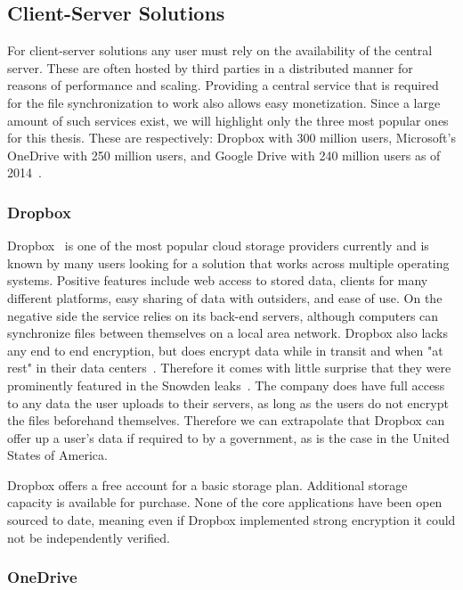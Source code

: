 \subsection{Client-Server Solutions}
\label{sub:Client-Server Solutions}

For client-server solutions any user must rely on the availability of the central server.
These are often hosted by third parties in a distributed manner for reasons of performance and scaling.
Providing a central service that is required for the file synchronization to work also allows easy monetization.
Since a large amount of such services exist, we will highlight only the three most popular ones for this thesis.
These are respectively: Dropbox with 300 million users, Microsoft's OneDrive with 250 million users, and Google Drive with 240 million users as of 2014~\cite{web:site:fortune}.

\subsubsection{Dropbox}
\label{subs:Dropbox}

Dropbox~\cite{web:site:dropbox} is one of the most popular cloud storage providers currently and is known by many users looking for a solution that works across multiple operating systems.
Positive features include web access to stored data, clients for many different platforms, easy sharing of data with outsiders, and ease of use.
On the negative side the service relies on its back-end servers, although computers can synchronize files between themselves on a local area network.
Dropbox also lacks any end to end encryption, but does encrypt data while in transit and when "at rest" in their data centers~\cite{web:site:dropbox:blog}.
Therefore it comes with little surprise that they were prominently featured in the Snowden leaks~\cite{web:site:rt:dropbox}.
The company does have full access to any data the user uploads to their servers, as long as the users do not encrypt the files beforehand themselves.
Therefore we can extrapolate that Dropbox can offer up a user's data if required to by a government, as is the case in the United States of America.

Dropbox offers a free account for a basic storage plan.
Additional storage capacity is available for purchase.
None of the core applications have been open sourced to date, meaning even if Dropbox implemented strong encryption it could not be independently verified.

\subsubsection{OneDrive}
\label{subs:OneDrive}

